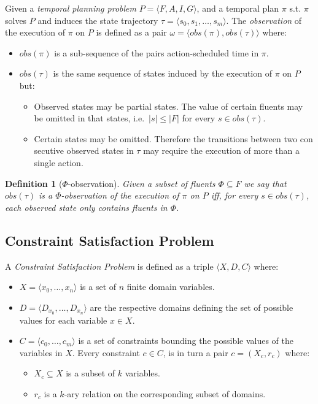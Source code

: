 \documentclass[letterpaper]{article} %
\newcommand{\tup}[1]{{\langle #1 \rangle}}
\newtheorem{definition}[theorem]{Definition}
\begin{document}
Given a {\em temporal planning problem} $P=\tup{F,A,I,G}$, and a temporal plan $\pi$ s.t. $\pi$ solves $P$ and induces the state trajectory $\tau=\tup{s_0, s_1, \ldots, s_m}$. The {\em observation} of the execution of $\pi$ on $P$ is defined as a pair $\omega=\tup{obs(\pi),obs(\tau)}$ where:
\begin{itemize}
\item $obs(\pi)$ is a sub-sequence of the pairs action-scheduled time in $\pi$.
\item $obs(\tau)$ is the same sequence of states induced by the execution of $\pi$ on $P$ but:
\begin{itemize}
\item Observed states may be partial states. The value of certain fluents may be omitted in that states, i.e.~$|s|\leq |F|$ for every $s\in obs(\tau)$.
\item Certain states may be omitted. Therefore the transitions between two con secutive observed states in $\tau$ may require the execution of more than a single action. 
\end{itemize}
\end{itemize}

\begin{definition}[$\Phi$-observation]
Given a subset of fluents $\Phi\subseteq F$ we say that $obs(\tau)$ is a $\Phi$-observation of the execution of $\pi$ on $P$ iff, for every $s\in obs(\tau)$, each observed state only contains fluents in $\Phi$.
\end{definition}


\subsection{Constraint Satisfaction Problem}
A {\em Constraint Satisfaction Problem} is defined as a triple $\tup{X,D,C}$ where:
\begin{itemize}
\item $X=\tup{x_0, \ldots, x_n}$ is a set of $n$ finite domain variables.
\item $D=\tup{D_{x_0}, \ldots, D_{x_n}}$ are the respective domains defining the set of possible values for each variable $x\in X$.
\item $C=\tup{c_0, \ldots, c_m}$ is a set of constraints bounding the possible values of the variables in $X$. Every constraint $c\in C$, is in turn a pair $c=(X_c,r_c)$ where:
\begin{itemize}
\item $X_c\subseteq X$ is a subset of $k$ variables.
\item $r_c$ is a $k$-ary relation on the corresponding subset of domains.
\end{itemize}
\end{itemize}
\end{document}
